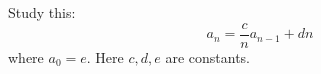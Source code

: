   Study this:
  \[
  a_n = \frac{c}{n} a_{n - 1} + dn
  \]
  where $a_0 = e$.
  Here $c,d,e$ are constants.
